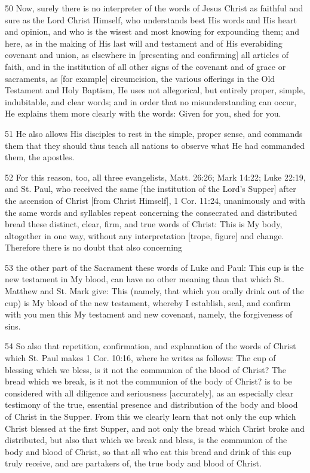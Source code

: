 50 Now, surely there is no interpreter of the words of Jesus Christ as faithful and sure as the Lord Christ Himself, who understands best His words and His heart and opinion, and who is the wisest and most knowing for expounding them; and here, as in the making of His last will and testament and of His everabiding covenant and union, as elsewhere in [presenting and confirming] all articles of faith, and in the institution of all other signs of the covenant and of grace or sacraments, as [for example] circumcision, the various offerings in the Old Testament and Holy Baptism, He uses not allegorical, but entirely proper, simple, indubitable, and clear words; and in order that no misunderstanding can occur, He explains them more clearly with the words: Given for you, shed for you.

51 He also allows His disciples to rest in the simple, proper sense, and commands them that they should thus teach all nations to observe what He had commanded them, the apostles.

52 For this reason, too, all three evangelists, Matt. 26:26; Mark 14:22; Luke 22:19, and St. Paul, who received the same [the institution of the Lord’s Supper] after the ascension of Christ [from Christ Himself], 1 Cor. 11:24, unanimously and with the same words and syllables repeat concerning the consecrated and distributed bread these distinct, clear, firm, and true words of Christ: This is My body, altogether in one way, without any interpretation [trope, figure] and change. Therefore there is no doubt that also concerning

53 the other part of the Sacrament these words of Luke and Paul: This cup is the new testament in My blood, can have no other meaning than that which St. Matthew and St. Mark give: This (namely, that which you orally drink out of the cup) is My blood of the new testament, whereby I establish, seal, and confirm with you men this My testament and new covenant, namely, the forgiveness of sins.

54 So also that repetition, confirmation, and explanation of the words of Christ which St. Paul makes 1 Cor. 10:16, where he writes as follows: The cup of blessing which we bless, is it not the communion of the blood of Christ? The bread which we break, is it not the communion of the body of Christ? is to be considered with all diligence and seriousness [accurately], as an especially clear testimony of the true, essential presence and distribution of the body and blood of Christ in the Supper. From this we clearly learn that not only the cup which Christ blessed at the first Supper, and not only the bread which Christ broke and distributed, but also that which we break and bless, is the communion of the body and blood of Christ, so that all who eat this bread and drink of this cup truly receive, and are partakers of, the true body and blood of Christ.

